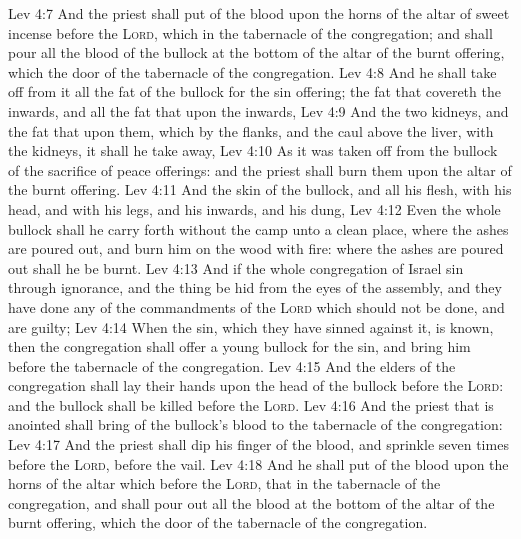 \vs Lev 4:7 And the priest shall put  of the blood upon the horns of the altar of sweet incense before the \textsc{Lord}, which  in the tabernacle of the congregation; and shall pour all the blood of the bullock at the bottom of the altar of the burnt offering, which  the door of the tabernacle of the congregation.
\vs Lev 4:8 And he shall take off from it all the fat of the bullock for the sin offering; the fat that covereth the inwards, and all the fat that  upon the inwards,
\vs Lev 4:9 And the two kidneys, and the fat that  upon them, which  by the flanks, and the caul above the liver, with the kidneys, it shall he take away,
\vs Lev 4:10 As it was taken off from the bullock of the sacrifice of peace offerings: and the priest shall burn them upon the altar of the burnt offering.
\vs Lev 4:11 And the skin of the bullock, and all his flesh, with his head, and with his legs, and his inwards, and his dung,
\vs Lev 4:12 Even the whole bullock shall he carry forth without the camp unto a clean place, where the ashes are poured out, and burn him on the wood with fire: where the ashes are poured out shall he be burnt.
\vs Lev 4:13 And if the whole congregation of Israel sin through ignorance, and the thing be hid from the eyes of the assembly, and they have done  any of the commandments of the \textsc{Lord}  which should not be done, and are guilty;
\vs Lev 4:14 When the sin, which they have sinned against it, is known, then the congregation shall offer a young bullock for the sin, and bring him before the tabernacle of the congregation.
\vs Lev 4:15 And the elders of the congregation shall lay their hands upon the head of the bullock before the \textsc{Lord}: and the bullock shall be killed before the \textsc{Lord}.
\vs Lev 4:16 And the priest that is anointed shall bring of the bullock's blood to the tabernacle of the congregation:
\vs Lev 4:17 And the priest shall dip his finger  of the blood, and sprinkle  seven times before the \textsc{Lord},  before the vail.
\vs Lev 4:18 And he shall put  of the blood upon the horns of the altar which  before the \textsc{Lord}, that  in the tabernacle of the congregation, and shall pour out all the blood at the bottom of the altar of the burnt offering, which  the door of the tabernacle of the congregation.
